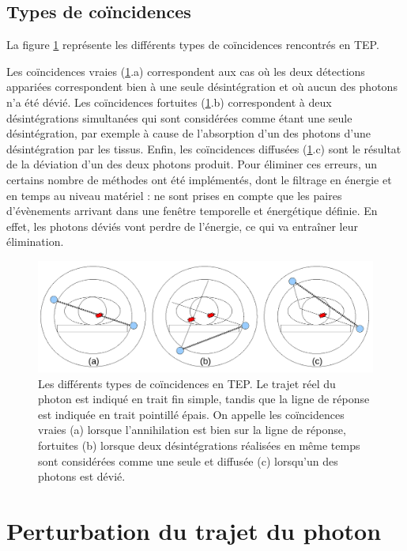 	\subsection{Types de coïncidences}

La figure \ref{fig:schemaDetections} représente les différents types de coïncidences rencontrés en TEP.

Les coïncidences vraies (\ref{fig:schemaDetections}.a) correspondent aux cas où les deux détections appariées correspondent bien à une seule désintégration et où aucun des photons n'a été dévié. Les coïncidences fortuites (\ref{fig:schemaDetections}.b) correspondent à deux désintégrations simultanées qui sont considérées comme étant une seule désintégration, par exemple à cause de l’absorption d’un des photons d’une désintégration par les tissus. Enfin, les coïncidences diffusées (\ref{fig:schemaDetections}.c) sont le résultat de la déviation d'un des deux photons produit. Pour éliminer ces erreurs, un certains nombre de méthodes ont été implémentés, dont le filtrage en énergie et en temps au niveau matériel : ne sont prises en compte que les paires d'évènements arrivant dans une fenêtre temporelle et énergétique définie. En effet, les photons déviés vont perdre de l'énergie, ce qui va entraîner leur élimination.

\begin{figure}
\centering
\includegraphics[width=12cm]{images/schemaDetections}
\caption[Les différents types de coïncidences en TEP]{Les différents types de coïncidences en TEP. Le trajet réel du photon est indiqué en trait fin simple, tandis que la ligne de réponse est indiquée en trait pointillé épais. On appelle les coïncidences vraies (a) lorsque l'annihilation est bien sur la ligne de réponse, fortuites (b) lorsque deux désintégrations réalisées en même temps sont considérées comme une seule et diffusée (c) lorsqu'un des photons est dévié.}
\label{fig:schemaDetections}
\end{figure}



	\section{Perturbation du trajet du photon}

